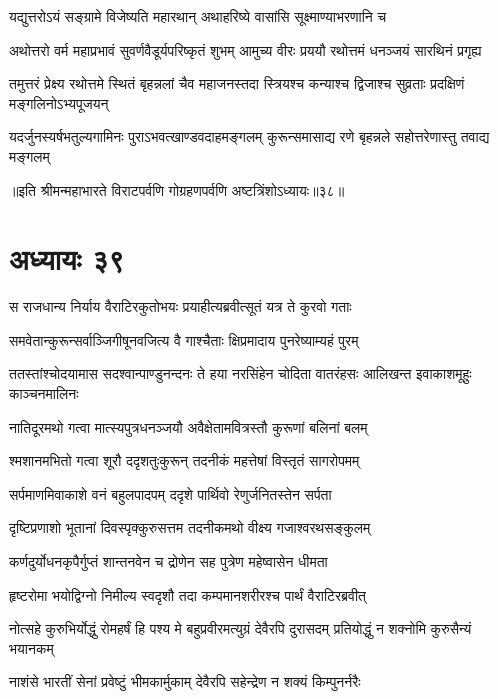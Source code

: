 \twolineshloka
{यद्युत्तरोऽयं सङ्ग्रामे विजेष्यति महारथान्}
{अथाहरिष्ये वासांसि सूक्ष्माण्याभरणानि च}



\twolineshloka
{अथोत्तरो वर्म महाप्रभावं सुवर्णवैडूर्यपरिष्कृतं शुभम्}
{आमुच्य वीरः प्रययौ रथोत्तमं धनञ्जयं सारथिनं प्रगृह्य}


\twolineshloka
{तमुत्तरं प्रेक्ष्य रथोत्तमे स्थितं बृहन्नलां चैव महाजनस्तदा}
{स्त्रियश्च कन्याश्च द्विजाश्च सुव्रताः प्रदक्षिणं मङ्गलिनोऽभ्यपूजयन्}


\twolineshloka
{यदर्जुनस्यर्षभतुल्यगामिनः पुराऽभवत्खाण्डवदाहमङ्गलम्}
{कुरून्समासाद्य रणे बृहन्नले सहोत्तरेणास्तु तवाद्य मङ्गलम्}

॥इति श्रीमन्महाभारते विराटपर्वणि गोग्रहणपर्वणि अष्टत्रिंशोऽध्यायः॥३८॥

\chapter{अध्यायः ३९}

\twolineshloka
{स राजधान्य निर्याय वैराटिरकुतोभयः}
{प्रयाहीत्यब्रवीत्सूतं यत्र ते कुरवो गताः}


\twolineshloka
{समवेतान्कुरून्सर्वाञ्जिगीषूनवजित्य वै}
{गाश्चैताः क्षिप्रमादाय पुनरेष्याम्यहं पुरम्}


\onelineshloka
{ततस्तांश्चोदयामास सदश्वान्पाण्डुनन्दनः}
\twolineshloka
{ते हया नरसिंहेन चोदिता वातरंहसः}
{आलिखन्त इवाकाशमूहुः काञ्चनमालिनः}


\twolineshloka
{नातिदूरमथो गत्वा मात्स्यपुत्रधनञ्जयौ}
{अवैक्षेतामवित्रस्तौ कुरूणां बलिनां बलम्}


\twolineshloka
{श्मशानमभितो गत्वा शूरौ ददृशतुःकुरून्}
{तदनीकं महत्तेषां विस्तृतं सागरोपमम्}


\twolineshloka
{सर्पमाणमिवाकाशे वनं बहुलपादपम्}
{ददृशे पार्थिवो रेणुर्जनितस्तेन सर्पता}


\twolineshloka
{दृष्टिप्रणाशो भूतानां दिवस्पृक्कुरुसत्तम}
{तदनीकमथो वीक्ष्य गजाश्वरथसङ्कुलम्}


\twolineshloka
{कर्णदुर्योधनकृपैर्गुप्तं शान्तनवेन च}
{द्रोणेन सह पुत्रेण महेष्वासेन धीमता}


\twolineshloka
{हृष्टरोमा भयोद्विग्नो निमील्य स्वदृशौ तदा}
{कम्पमानशरीरश्च पार्थं वैराटिरब्रवीत्}


\threelineshloka
{नोत्सहे कुरुभिर्योद्धुं रोमहर्षं हि पश्य मे}
{बहुप्रवीरमत्युग्रं देवैरपि दुरासदम्}
{प्रतियोद्धुं न शक्नोमि कुरुसैन्यं भयानकम्}


\twolineshloka
{नाशंसे भारतीं सेनां प्रवेष्टुं भीमकार्मुकाम्}
{देवैरपि सहेन्द्रेण न शक्यं किम्पुनर्नरैः}


